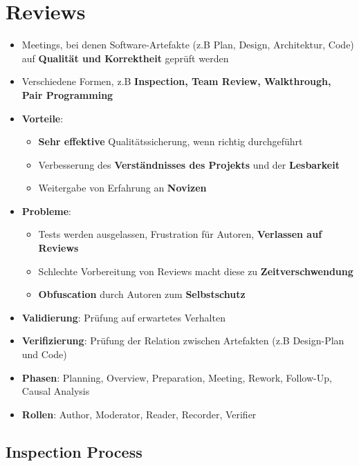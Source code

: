 \section{Reviews}
\label{rvs:sec:reviews}

\begin{itemize}
	\item Meetings, bei denen Software-Artefakte (z.B Plan, Design, Architektur, Code) auf \textbf{Qualität und Korrektheit} geprüft werden
	\item Verschiedene Formen, z.B \textbf{Inspection, Team Review, Walkthrough, Pair Programming}
	\item \textbf{Vorteile}:
	\begin{itemize}
		\item \textbf{Sehr effektive} Qualitätssicherung, wenn richtig durchgeführt
		\item Verbesserung des \textbf{Verständnisses des Projekts} und der \textbf{Lesbarkeit}
		\item Weitergabe von Erfahrung an \textbf{Novizen}
	\end{itemize}
	\item \textbf{Probleme}:
	\begin{itemize}
		\item Tests werden ausgelassen, Frustration für Autoren, \textbf{Verlassen auf Reviews}
		\item Schlechte Vorbereitung von Reviews macht diese zu \textbf{Zeitverschwendung}
		\item \textbf{Obfuscation} durch Autoren zum \textbf{Selbstschutz}
	\end{itemize}
	\item \textbf{Validierung}: Prüfung auf erwartetes Verhalten
	\item \textbf{Verifizierung}: Prüfung der Relation zwischen Artefakten (z.B Design-Plan und Code)
	\item \textbf{Phasen}: Planning, Overview, Preparation, Meeting, Rework, Follow-Up, Causal Analysis
	\item \textbf{Rollen}: Author, Moderator, Reader, Recorder, Verifier
\end{itemize}

\subsection{Inspection Process}
\label{rvs:sub:inspection_process}

